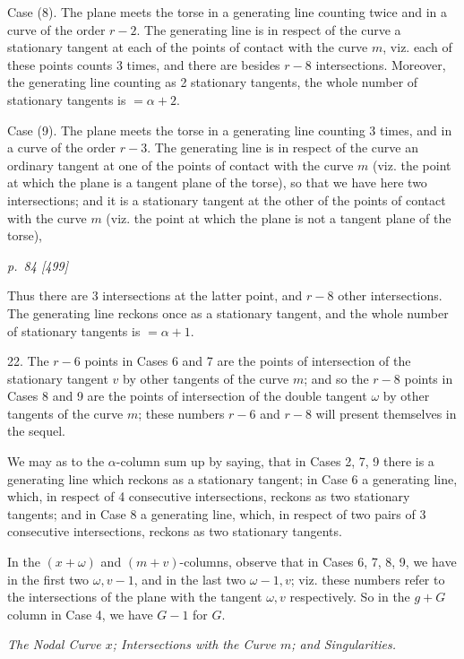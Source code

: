 \documentclass[11pt,a4paper]{article}
\newcommand{\pagemarker}[2]{\clearpage\noindent\textit{p.~#1 [#2]}\par\medskip}
\begin{document}
Case (8). The plane meets the torse in a generating line counting twice and in a
curve of the order \(r-2\). The generating line is in respect of the curve a stationary
tangent at each of the points of contact with the curve \(m\), viz. each of these points
counts 3 times, and there are besides \(r-8\) intersections. Moreover, the generating
line counting as 2 stationary tangents, the whole number of stationary tangents is
\(=\alpha+2\).

Case (9). The plane meets the torse in a generating line counting 3 times, and in a
curve of the order \(r-3\). The generating line is in respect of the curve an ordinary
tangent at one of the points of contact with the curve \(m\) (viz. the point at which
the plane is a tangent plane of the torse), so that we have here two intersections;
and it is a stationary tangent at the other of the points of contact with the curve
\(m\) (viz. the point at which the plane is not a tangent plane of the torse),

\pagemarker{84}{499}
Thus there are 3 intersections at the latter point, and \(r-8\) other intersections. The
generating line reckons once as a stationary tangent, and the whole number of
stationary tangents is \(=\alpha+1\).

22. The \(r-6\) points in Cases 6 and 7 are the points of intersection of the
stationary tangent \(v\) by other tangents of the curve \(m\); and so the \(r-8\) points
in Cases 8 and 9 are the points of intersection of the double tangent \(\omega\) by other
tangents of the curve \(m\); these numbers \(r-6\) and \(r-8\) will present themselves
in the sequel.

We may as to the \(\alpha\)-column sum up by saying, that in Cases 2, 7, 9 there is a
generating line which reckons as a stationary tangent; in Case 6 a generating line,
which, in respect of 4 consecutive intersections, reckons as two stationary tangents;
and in Case 8 a generating line, which, in respect of two pairs of 3 consecutive
intersections, reckons as two stationary tangents.

In the \((x+\omega)\) and \((m+v)\)-columns, observe that in Cases 6, 7, 8, 9, we have
in the first two \(\omega, v-1\), and in the last two \(\omega-1,v\); viz. these numbers
refer to the intersections of the plane with the tangent \(\omega,v\) respectively.
So in the \(g+G\) column in Case 4, we have \(G-1\) for \(G\).

\begin{center}\textit{The Nodal Curve \(x\); Intersections with the Curve \(m\); and Singularities.}\end{center}
\end{document}
